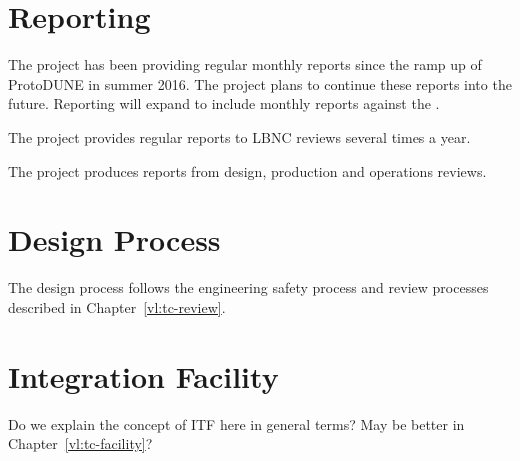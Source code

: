 \section{Reporting}
\label{sec:fdsp-coord-reporting}

The  project has been providing regular monthly reports
since the ramp up of ProtoDUNE in summer 2016. The project plans to
continue these reports into the future. Reporting will expand to
include monthly reports against the .

The  project provides regular reports to LBNC reviews
several times a year.

The  project produces reports from design, production and operations reviews.



\section{Design Process}
\label{sec:fdsp-coord-designprocess}

The design process follows the engineering safety process and review
processes described in Chapter~\ref{vl:tc-review}.

\section{Integration Facility}
\label{sec:fdsp-coord-itf}

Do we explain the concept of ITF here in general terms? May be better
in Chapter~\ref{vl:tc-facility}?
